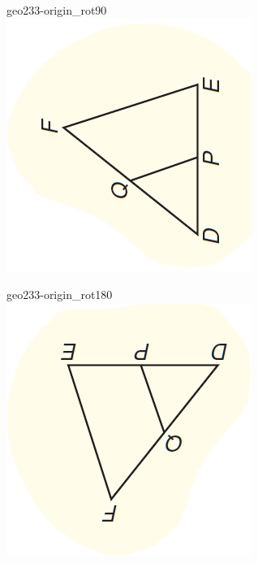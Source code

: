 \documentclass[12pt]{article}
\begin{document}
\begin{center}
\begin{minipage}{0.32\textwidth}
\end{minipage}
\hfill\begin{minipage}{0.32\textwidth}\centering
geo233-origin\_rot90\\
\includegraphics[width=0.95\linewidth]{out_rommath_origin/items/geo233-origin/assets/figure_rot90.png}
\end{minipage}
\par\medskip
\begin{minipage}{0.32\textwidth}\centering
geo233-origin\_rot180\\
\includegraphics[width=0.95\linewidth]{out_rommath_origin/items/geo233-origin/assets/figure_rot180.png}

\end{minipage}
\end{center}
\end{document}
